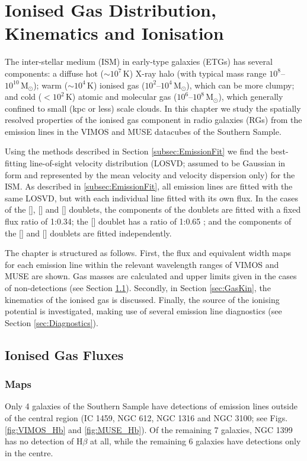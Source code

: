 \chapter{Ionised Gas Distribution, Kinematics and Ionisation}
	\label{cha:gas}
The inter-stellar medium (ISM) in early-type galaxies (ETGs) has several components: a diffuse hot ($\sim 10^7 \, \mathrm{K}$) X-ray halo (with typical mass range $10^8$--$10^{10} \, \mathrm{M_\odot}$); warm ($\sim 10^4 \, \mathrm{K}$) ionised gas ($10^2$--$10^4 \, \mathrm{M_\odot}$), which can be more clumpy; and cold ($<10^2 \, \mathrm{K}$) atomic and molecular gas ($10^6$--$10^8 \, \mathrm{M_\odot}$), which generally confined to small (kpc or less) scale clouds. In this chapter we study the spatially resolved properties of the ionised gas component in radio galaxies (RGs) from the emission lines in the VIMOS and MUSE datacubes of the Southern Sample.

Using the methods described in Section \ref{subsec:EmissionFit} we find the best-fitting line-of-sight velocity distribution (LOSVD; assumed to be Gaussian in form and represented by the mean velocity and velocity dispersion only) for the ISM. As described in \ref{subsec:EmissionFit}, all emission lines are fitted with the same LOSVD, but with each individual line fitted with its own flux. In the cases of the [], [] and [] doublets, the components of the doublets are fitted with a fixed flux ratio of 1:0.34; the [] doublet has a ratio of 1:0.65 \citep{Safier1992}; and the components of the [] and [] doublets are fitted independently.

The chapter is structured as follows. First, the flux and equivalent width maps for each emission line within the relevant wavelength ranges of VIMOS and MUSE are shown. Gas masses are calculated and upper limits given in the cases of non-detections (see Section \ref{sec:GasFlux}). Secondly, in Section \ref{sec:GasKin}, the kinematics of the ionised gas is discussed. Finally, the source of the ionising potential is investigated, making use of several emission line diagnostics (see Section \ref{sec:Diagnostics}).


\section{Ionised Gas Fluxes}
	\label{sec:GasFlux}
	\subsection{Maps}
		\label{subsec:GasMaps}
		Only 4 galaxies of the Southern Sample have detections of emission lines outside of the central region (IC 1459, NGC 612, NGC 1316 and NGC 3100; see Figs.\,\ref{fig:VIMOS_Hb} and \ref{fig:MUSE_Hb}).  Of the remaining 7 galaxies, NGC 1399 has no detection of H$\beta$ at all, while the remaining 6 galaxies have detections only in the centre. 

